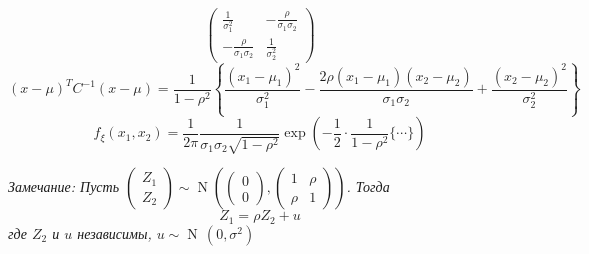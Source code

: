 \documentclass[a4paper,11pt]{article}
\begin{document}
{\begin{enumerate}
{\[\begin{pmatrix}
                    \frac{1}{\sigma_1^2} & -\frac{\rho}{\sigma_1\sigma_2}\\
                    -\frac{\rho}{\sigma_1\sigma_2} & \frac{1}{\sigma_2^2}
                \end{pmatrix}\]
                \[(x - \mu)^TC^{-1}(x - \mu) = \frac{1}{1 - \rho^2}\left\{\frac{(x_1 - \mu_1)^2}{\sigma_1^2} - \frac{2\rho(x_1 - \mu_1)(x_2 - \mu_2)}{\sigma_1\sigma_2} + \frac{(x_2 - \mu_2)^2}{\sigma_2^2}\right\}\]
                \[f_\xi(x_1,x_2) = \frac{1}{2\pi}\frac{1}{\sigma_1\sigma_2\sqrt{1 - \rho^2}}\exp\left(-\frac{1}{2}\cdot\frac{1}{1 - \rho^2}\{\cdots\}\right)\]
                \textit{Замечание: Пусть $\begin{pmatrix}
                    Z_1\\
                    Z_2
                \end{pmatrix} \sim \operatorname{N}\left(\begin{pmatrix}
                    0\\
                    0
                \end{pmatrix},\begin{pmatrix}
                    1 & \rho\\
                    \rho & 1
                \end{pmatrix}\right)$. Тогда
                \[Z_1 = \rho Z_2 + u\]
                где $Z_2$ и $u$ независимы, $u \sim \operatorname{N}\,(0, \sigma^2)$}
                \prof{
                    \[\begin{pmatrix}
                    u\\
                    Z_2
                \end{pmatrix} = \begin{pmatrix}
                    1 & -\rho\\
                    0 & 1
                \end{pmatrix}\begin{pmatrix}
                    Z_1\\
                    Z_2
                \end{pmatrix} = \begin{pmatrix}
                    Z_1 - \rho Z_2\\
                    z_2
                \end{pmatrix} \sim \operatorname{N}\left(\begin{pmatrix}

\end{pmatrix}\]}}
\end{enumerate}}
\end{document}
